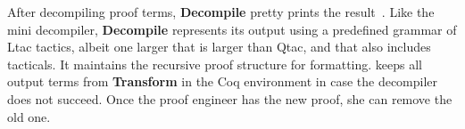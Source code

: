 After decompiling proof terms, \textbf{Decompile} pretty prints the result~\href{https://github.com/uwplse/pumpkin-pi/blob/silent/plugin/src/coq-plugin-lib/src/coq/decompiler/decompiler.ml}{}.
Like the mini decompiler, \textbf{Decompile} represents its output using a predefined grammar of Ltac tactics,
albeit one larger that is larger than Qtac, and that also includes tacticals.
It maintains the recursive proof structure for formatting. %
\toolnamec keeps all output terms from \textbf{Transform} in the Coq environment in case the decompiler does not succeed.
Once the proof engineer has the new proof, she can remove the old one.


